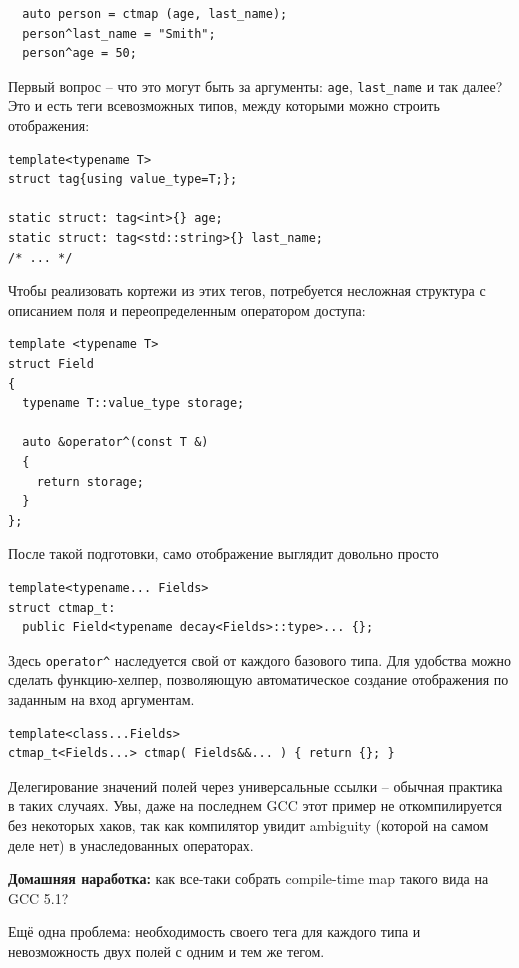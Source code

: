 \documentclass[a4paper,12pt,oneside]{book}
\begin{document}
\begin{lstlisting}
  auto person = ctmap (age, last_name);
  person^last_name = "Smith";
  person^age = 50;
\end{lstlisting}

Первый вопрос -- что это могут быть за аргументы: \lstinline!age!, \lstinline!last_name! и так далее? Это и есть теги всевозможных типов, между которыми можно строить отображения:

\begin{lstlisting}
template<typename T>
struct tag{using value_type=T;};

static struct: tag<int>{} age;
static struct: tag<std::string>{} last_name;
/* ... */
\end{lstlisting}

Чтобы реализовать кортежи из этих тегов, потребуется несложная структура с описанием поля и переопределенным оператором доступа:

\begin{lstlisting}
template <typename T>
struct Field 
{
  typename T::value_type storage;

  auto &operator^(const T &) 
  {
    return storage;
  }
};
\end{lstlisting}

После такой подготовки, само отображение выглядит довольно просто

\begin{lstlisting}
template<typename... Fields>
struct ctmap_t: 
  public Field<typename decay<Fields>::type>... {};
\end{lstlisting}

Здесь \lstinline!operator^! наследуется свой от каждого базового типа. Для удобства можно сделать функцию-хелпер, позволяющую автоматическое создание отображения по заданным на вход аргументам.

\begin{lstlisting}
template<class...Fields>
ctmap_t<Fields...> ctmap( Fields&&... ) { return {}; }
\end{lstlisting}

Делегирование значений полей через универсальные ссылки -- обычная практика в таких случаях. Увы, даже на последнем GCC этот пример не откомпилируется без некоторых хаков, так как компилятор увидит ambiguity (которой на самом деле нет) в унаследованных операторах.

\textbf{Домашняя наработка:} как все-таки собрать compile-time map такого вида на GCC 5.1?

Ещё одна проблема: необходимость своего тега для каждого типа и невозможность двух полей с одним и тем же тегом.
\end{document}
